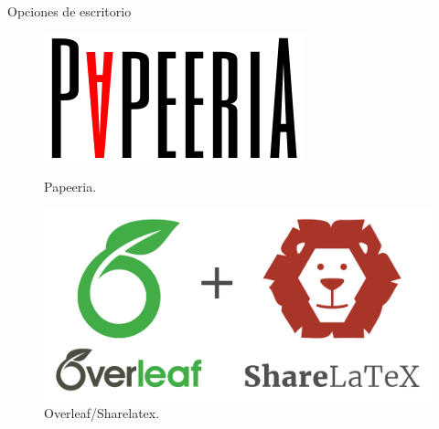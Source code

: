 \documentclass[aspectratio=169, 10pt]{beamer}
\begin{document}
\begin{frame}{Opciones de escritorio}
\begin{figure}
    \begin{minipage}{0.35\textwidth}
        \includegraphics[scale=0.35]{papeeria.png} 
        \caption*{Papeeria.}
    \end{minipage}\hfill
    \begin{minipage}{0.35\textwidth}
        \includegraphics[scale=0.15]{sharelatex_overleaf.png} 
        \caption*{Overleaf/Sharelatex.}
    \end{minipage}
\end{figure}
\end{frame}

\end{document}
